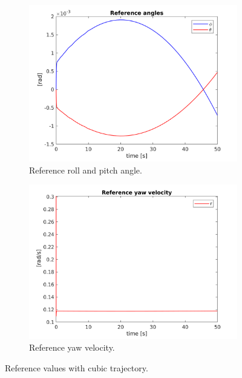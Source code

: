 \documentclass[11pt,a4paper]{scrartcl}
\begin{document}
\begin{figure}[h]
	\begin{subfigure}[h!]{0.5\linewidth}
		\centering
		\includegraphics[width=\textwidth]{Images/AngleOuter.png}
		\caption{Reference roll and pitch angle.}
		\label{fig:outercontrolangles}
	\end{subfigure}	
	\begin{subfigure}[h!]{0.5\linewidth}
		\centering
		\includegraphics[width=\textwidth]{Images/velOuter.png}
		\caption{Reference yaw velocity.}
		\label{fig:outercontrolvel}
\end{subfigure}	
\caption{Reference values with cubic trajectory.}
\label{fig:ReferenceValues}
\end{figure}
\end{document}
